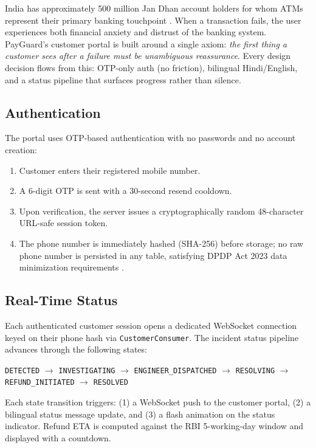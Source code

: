 \documentclass[11pt,a4paper]{article}
\begin{document}
India has approximately 500 million Jan Dhan account holders for whom ATMs represent their primary banking touchpoint \citep{rbi2024}. When a transaction fails, the user experiences both financial anxiety and distrust of the banking system. PayGuard's customer portal is built around a single axiom: \textit{the first thing a customer sees after a failure must be unambiguous reassurance}. Every design decision flows from this: OTP-only auth (no friction), bilingual Hindi/English, and a status pipeline that surfaces progress rather than silence.

\subsection{Authentication}

The portal uses OTP-based authentication with no passwords and no account creation:
\begin{enumerate}
  \item Customer enters their registered mobile number.
  \item A 6-digit OTP is sent with a 30-second resend cooldown.
  \item Upon verification, the server issues a cryptographically random 48-character URL-safe session token.
  \item The phone number is immediately hashed (SHA-256) before storage; no raw phone number is persisted in any table, satisfying DPDP Act 2023 data minimization requirements \citep{dpdp2023}.
\end{enumerate}

\subsection{Real-Time Status}

Each authenticated customer session opens a dedicated WebSocket connection keyed on their phone hash via \texttt{CustomerConsumer}. The incident status pipeline advances through the following states:

\begin{center}
\texttt{DETECTED} $\to$ \texttt{INVESTIGATING} $\to$ \texttt{ENGINEER\_DISPATCHED} $\to$ \texttt{RESOLVING} $\to$ \texttt{REFUND\_INITIATED} $\to$ \texttt{RESOLVED}
\end{center}

Each state transition triggers: (1) a WebSocket push to the customer portal, (2) a bilingual status message update, and (3) a flash animation on the status indicator. Refund ETA is computed against the RBI 5-working-day window and displayed with a countdown.
\end{document}
